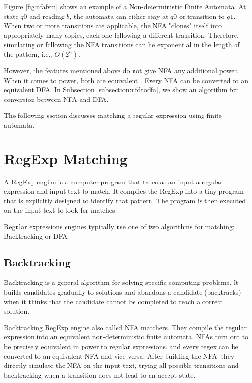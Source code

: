 Figure \ref{fig:nfafsm} shows an example of a Non-deterministic Finite Automata. At state $q0$ and reading $b$, the automata can either stay at $q0$ or transition to $q1$. When two or more transitions are applicable, the NFA "clones" itself into appropriately many copies, each one following a different transition. Therefore, simulating or following the NFA transitions can be exponential in the length of the pattern, i.e., $O(2^{n})$.

However, the features mentioned above do not give NFA any additional power. When it comes to power, both are equivalent \cite{nfadfaeq}. Every NFA can be converted to an equivalent DFA. In Subsection \ref{subsection:nfdtodfa}, we show an algorithm for conversion between NFA and DFA.

The following section discusses matching a regular expression using finite automata.

\newpage
\section{RegExp Matching}

A RegExp engine is a computer program that takes as an input a regular expression and input text to match. It compiles the RegExp into a tiny program that is explicitly designed to identify that pattern. The program is then executed on the input text to look for matches.

Regular expressions engines typically use one of two algorithms for matching: Backtracking or DFA.

\subsection{Backtracking}

Backtracking is a general algorithm for solving specific computing problems. It builds candidates gradually to solutions and abandons a candidate (backtracks) when it thinks that the candidate cannot be completed to reach a correct solution.

Backtracking RegExp engine also called NFA matchers. They compile the regular expression into an equivalent non-deterministic finite automata. NFAs turn out to be precisely equivalent in power to regular expressions, and every regex can be converted to an equivalent NFA and vice versa. After building the NFA, they directly simulate the NFA on the input text, trying all possible transitions and backtracking when a transition does not lead to an accept state.


